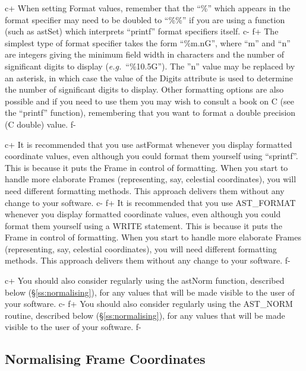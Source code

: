 \documentclass[twoside,11pt]{article}
\newcommand{\secref}[1]{\S\ref{#1}}
\newcommand{\secref}[1]{\ref{#1}}
\begin{document}
c+
When setting Format values, remember that the ``\%'' which appears in
the format specifier may need to be doubled to ``\%\%'' if you are
using a function (such as astSet) which interprets ``printf'' format
specifiers itself.
c-
f+
The simplest type of format specifier takes the form ``\%m.nG'', where
``m'' and ``n'' are integers giving the minimum field width in characters
and the number of significant digits to display ({\em{e.g.}}\
``\%10.5G''). The ''n'' value may be replaced by an asterisk, in which
case the value of the Digits attribute is used to determine the number of
significant digits to display. Other formatting options are also possible
and if you need to use them you may wish to consult a book on C (see the
``printf'' function), remembering that you want to format a double
precision (C double) value.
f-

c+
It is recommended that you use astFormat whenever you display
formatted coordinate values, even although you could format them
yourself using ``sprintf''. This is because it puts the Frame in
control of formatting. When you start to handle more elaborate Frames
(representing, say, celestial coordinates), you will need different
formatting methods. This approach delivers them without any change to
your software.
c-
f+
It is recommended that you use AST\_FORMAT whenever you display
formatted coordinate values, even although you could format them
yourself using a WRITE statement. This is because it puts the Frame in
control of formatting. When you start to handle more elaborate Frames
(representing, say, celestial coordinates), you will need different
formatting methods. This approach delivers them without any change to
your software.
f-

c+
You should also consider regularly using the astNorm function,
described below (\secref{ss:normalising}), for any values that will be
made visible to the user of your software.
c-
f+
You should also consider regularly using the AST\_NORM routine,
described below (\secref{ss:normalising}), for any values that will be
made visible to the user of your software.
f-

\subsection{\label{ss:normalising}Normalising Frame Coordinates}
\end{document}
